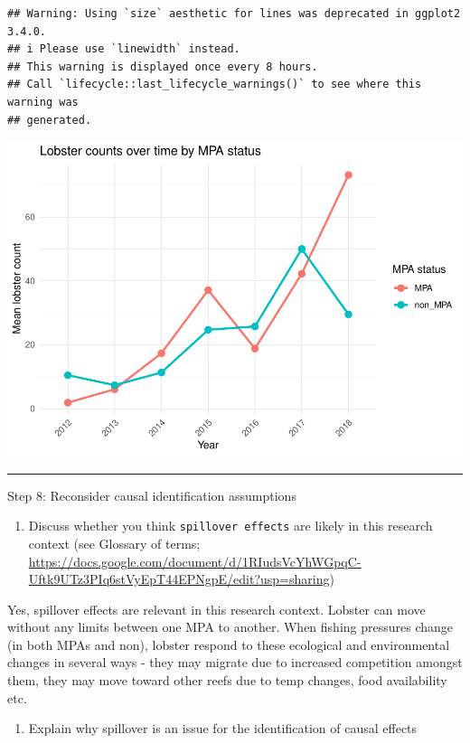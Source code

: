 \documentclass[
]{article}
\providecommand{\tightlist}{%
  \setlength{\itemsep}{0pt}\setlength{\parskip}{0pt}}
\begin{document}
\begin{verbatim}
## Warning: Using `size` aesthetic for lines was deprecated in ggplot2 3.4.0.
## i Please use `linewidth` instead.
## This warning is displayed once every 8 hours.
## Call `lifecycle::last_lifecycle_warnings()` to see where this warning was
## generated.
\end{verbatim}

\includegraphics{hw1-lobstrs-eds241_files/figure-latex/unnamed-chunk-32-1.pdf}

\begin{center}\rule{0.5\linewidth}{0.5pt}\end{center}

Step 8: Reconsider causal identification assumptions

\begin{enumerate}
\def\labelenumi{\alph{enumi}.}
\tightlist
\item
  Discuss whether you think \texttt{spillover\ effects} are likely in
  this research context (see Glossary of terms;
  \url{https://docs.google.com/document/d/1RIudsVcYhWGpqC-Uftk9UTz3PIq6stVyEpT44EPNgpE/edit?usp=sharing})
\end{enumerate}

Yes, spillover effects are relevant in this research context. Lobster
can move without any limits between one MPA to another. When fishing
pressures change (in both MPAs and non), lobster respond to these
ecological and environmental changes in several ways - they may migrate
due to increased competition amongst them, they may move toward other
reefs due to temp changes, food availability etc.

\begin{enumerate}
\def\labelenumi{\alph{enumi}.}
\setcounter{enumi}{1}
\tightlist
\item
  Explain why spillover is an issue for the identification of causal
  effects
\end{enumerate}
\end{document}
